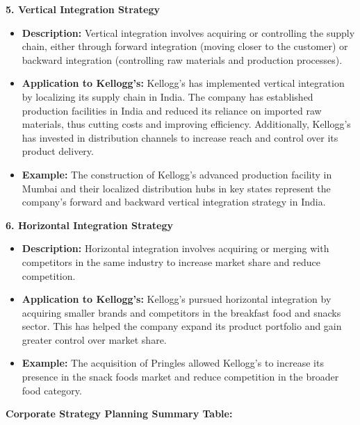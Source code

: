 \documentclass[10pt,a4paper]{book}
\begin{document}
\textbf{5. Vertical Integration Strategy}
\begin{itemize}
    \item \textbf{Description:} Vertical integration involves acquiring or controlling the supply chain, either through forward integration (moving closer to the customer) or backward integration (controlling raw materials and production processes).
    \item \textbf{Application to Kellogg's:} Kellogg's has implemented vertical integration by localizing its supply chain in India. The company has established production facilities in India and reduced its reliance on imported raw materials, thus cutting costs and improving efficiency. Additionally, Kellogg's has invested in distribution channels to increase reach and control over its product delivery.
    \item \textbf{Example:} The construction of Kellogg’s advanced production facility in Mumbai and their localized distribution hubs in key states represent the company’s forward and backward vertical integration strategy in India.
\end{itemize}

\vspace{0.5cm}

\textbf{6. Horizontal Integration Strategy}
\begin{itemize}
    \item \textbf{Description:} Horizontal integration involves acquiring or merging with competitors in the same industry to increase market share and reduce competition.
    \item \textbf{Application to Kellogg's:} Kellogg's pursued horizontal integration by acquiring smaller brands and competitors in the breakfast food and snacks sector. This has helped the company expand its product portfolio and gain greater control over market share.
    \item \textbf{Example:} The acquisition of Pringles allowed Kellogg’s to increase its presence in the snack foods market and reduce competition in the broader food category.
\end{itemize}

\vspace{0.5cm}

\textbf{Corporate Strategy Planning Summary Table:}
\end{document}
